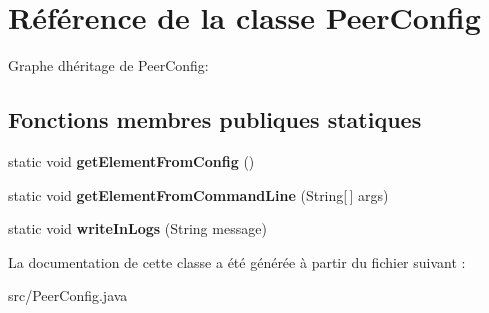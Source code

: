 \hypertarget{classPeerConfig}{}\section{Référence de la classe Peer\+Config}
\label{classPeerConfig}


Graphe d\textquotesingle{}héritage de Peer\+Config\+:
\subsection*{Fonctions membres publiques statiques}
\begin{DoxyCompactItemize}
\item 
\mbox{\label{classPeerConfig_aa3a2d55ff44eb39ee0d06d31f33bf31c}} 
static void {\bfseries get\+Element\+From\+Config} ()
\item 
\mbox{\label{classPeerConfig_a758972c6835b76e73c6ff4e0929d5932}} 
static void {\bfseries get\+Element\+From\+Command\+Line} (String\mbox{[}$\,$\mbox{]} args)
\item 
\mbox{\label{classPeerConfig_ae226c1c5ac2cfeb4e0c7f231377202fc}} 
static void {\bfseries write\+In\+Logs} (String message)
\end{DoxyCompactItemize}


La documentation de cette classe a été générée à partir du fichier suivant \+:\begin{DoxyCompactItemize}
\item 
src/Peer\+Config.\+java\end{DoxyCompactItemize}
